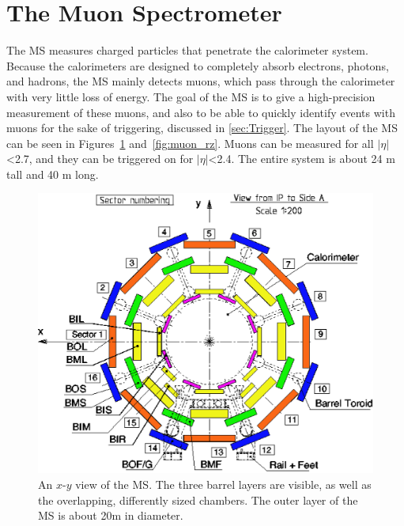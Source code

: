 \section{The Muon Spectrometer}
\label{sec:MS}

The \acf{MS} measures charged particles that penetrate the calorimeter system. Because the calorimeters are designed to completely absorb electrons, photons, and hadrons, the \ac{MS} mainly detects muons, which pass through the calorimeter with very little loss of energy. The goal of the \ac{MS} is to give a high-precision measurement of these muons, and also to be able to quickly identify events with muons for the sake of triggering, discussed in \autoref{sec:Trigger}. The layout of the \ac{MS} can be seen in Figures~\ref{fig:muon_xy} and~\ref{fig:muon_rz}. Muons can be measured for all $|\eta|$<2.7, and they can be triggered on for $|\eta|$<2.4. The entire system is about 24 m tall and 40 m long. 

\begin{centering}
\begin{figure}[bth]
\myfloatalign
\includegraphics[width=.90\linewidth]{figures/atlas/Muon_sector_numbering.eps}
\caption{An $x$-$y$ view of the \ac{MS}. The three barrel layers are visible, as well as the overlapping, differently sized chambers. The outer layer of the \ac{MS} is about 20m in diameter.}
\label{fig:muon_xy}
\end{figure}
\end{centering}

